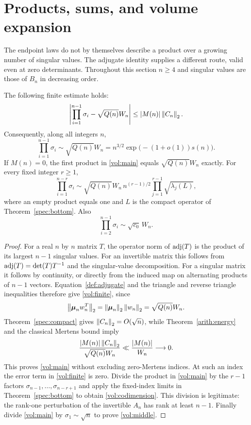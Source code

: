 \section{Products, sums, and volume expansion}\label{sec:volumes}

The endpoint laws do not by themselves describe a product over a growing number of singular values. The adjugate identity supplies a different route, valid even at zero determinants. Throughout this section $n\ge4$ and singular values are those of $B_n$ in decreasing order.

\begin{theorem}\label{vol:product}
The following finite estimate holds:
\begin{equation}\label{vol:finite}
 \left|\prod_{i=1}^{n-1}\sigma_i-\sqrt{Q(n)}W_n\right|
 \le |M(n)|\left\lVert C_n\right\rVert_2.
\end{equation}
Consequently, along all integers $n$,
\begin{equation}\label{vol:main}
 \prod_{i=1}^{n-1}\sigma_i\sim\sqrt{Q(n)}W_n
 =n^{3/2}\exp\bigl(-(1+o(1))s(n)\bigr).
\end{equation}
If $M(n)=0$, the first product in \eqref{vol:main} equals $\sqrt{Q(n)}W_n$ exactly. For every fixed integer $r\ge1$,
\begin{equation}\label{vol:codimension}
 \prod_{i=1}^{n-r}\sigma_i
 \sim\sqrt{Q(n)}W_n\,n^{(r-1)/2}
                  \prod_{j=1}^{r-1}\sqrt{\lambda_j(L)},
\end{equation}
where an empty product equals one and $L$ is the compact operator of Theorem~\ref{spec:bottom}. Also
\begin{equation}\label{vol:middle}
 \prod_{i=2}^{n-1}\sigma_i\sim\sqrt{c_0}\,W_n.
\end{equation}
\end{theorem}
\begin{proof}
For a real $n$ by $n$ matrix $T$, the operator norm of $\operatorname{adj}(T)$ is the product of its largest $n-1$ singular values. For an invertible matrix this follows from $\operatorname{adj}(T)=\det(T)T^{-1}$ and the singular-value decomposition. For a singular matrix it follows by continuity, or directly from the induced map on alternating products of $n-1$ vectors. Equation~\eqref{def:adjugate} and the triangle and reverse triangle inequalities therefore give \eqref{vol:finite}, since
\[
 \left\lVert\boldsymbol{\mu}_nw_n^T\right\rVert_2=\left\lVert\boldsymbol{\mu}_n\right\rVert_2\left\lVert w_n\right\rVert_2=\sqrt{Q(n)}W_n.
\]
Theorem~\ref{spec:compact} gives $\left\lVert C_n\right\rVert_2=O(\sqrt n)$, while Theorem~\ref{arith:energy} and the classical Mertens bound imply
\[
 \frac{|M(n)|\left\lVert C_n\right\rVert_2}{\sqrt{Q(n)}W_n}
 \ll\frac{|M(n)|}{W_n}\longrightarrow0.
\]
This proves \eqref{vol:main} without excluding zero-Mertens indices. At such an index the error term in \eqref{vol:finite} is zero. Divide the product in \eqref{vol:main} by the $r-1$ factors $\sigma_{n-1},\ldots,\sigma_{n-r+1}$ and apply the fixed-index limits in Theorem~\ref{spec:bottom} to obtain \eqref{vol:codimension}. This division is legitimate: the rank-one perturbation of the invertible $A_n$ has rank at least $n-1$. Finally divide \eqref{vol:main} by $\sigma_1\sim\sqrt n$ to prove \eqref{vol:middle}.
\end{proof}

